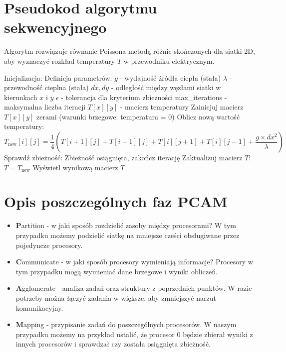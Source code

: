 \documentclass{article}
\begin{document}
\section*{Pseudokod algorytmu sekwencyjnego}
Algorytm rozwiązuje równanie Poissona metodą różnic skończonych dla siatki 2D, aby wyznaczyć rozkład temperatury \(T\) w przewodniku elektrycznym. 

\begin{algorithm}[H]
\caption{Algorytm sekwencyjny}
\begin{algorithmic}[1]
    \STATE Inicjalizacja:
    \STATE Definicja parametrów:
    \STATE \quad $g$ - wydajność źródła ciepła (stała)
    \STATE \quad $\lambda$ - przewodność cieplna (stała)
    \STATE \quad $dx, dy$ - odległość między węzłami siatki w kierunkach $x$ i $y$
    \STATE \quad $\epsilon$ - tolerancja dla kryterium zbieżności
    \STATE \quad max\_iterations - maksymalna liczba iteracji
    \STATE \quad $T[x][y]$ - macierz temperatury
    \STATE Zainicjuj macierz $T[x][y]$ zerami (warunki brzegowe: temperatura = 0)
    \REPEAT
        \STATE Oblicz nową wartość temperatury:
        \[
        T_{\text{new}}[i][j] = \frac{1}{4} (T[i+1][j] + T[i-1][j] + T[i][j+1] + T[i][j-1] + \frac{g \times dx^2}{\lambda})
        \]
    \ENDFOR
    \STATE Sprawdź zbieżność:
        \STATE Zbieżność osiągnięta, zakończ iterację
    \ENDIF
    \STATE Zaktualizuj macierz $T$: $T = T_{\text{new}}$
    \STATE Wyświetl wynikową macierz $T$
\end{algorithmic}
\end{algorithm}

\section*{Opis poszczególnych faz PCAM}
\begin{itemize}
    \item \textbf{P}artition - w jaki sposób rozdzielić zasoby między procesorami? W tym przypadku możemy podzielić siatkę na mniejsze cześci obsługiwane przez pojedyncze procesory.
    \item \textbf{C}ommunicate - w jaki sposób procesory wymieniają informacje? Procesory w tym przypadku mogą wymieniać dane brzegowe i wyniki obliczeń.
    \item \textbf{A}gglomerate - analiza zadań oraz struktury z poprzednich punktów. W razie potrzeby można łączyć zadania w większe, aby zmniejszyć narzut komunikacyjny.
    \item \textbf{M}apping - przypisanie zadań do poszczególnych procesorów. W naszym przypadku możemy na przykład ustalić, że procesor 0 będzie zbierał wyniki z innych procesorów i sprawdzał czy została osiągnięta zbieżność.
\end{itemize}
\end{document}
